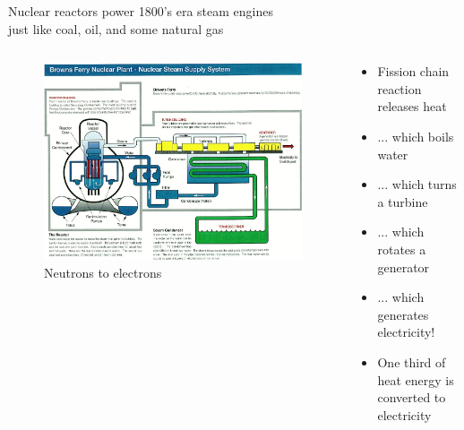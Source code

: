 \documentclass{beamer}
\begin{document}
        \begin{frame}{Nuclear reactors power 1800's era steam engines \\ just like coal, oil, and some natural gas}

            \begin{columns}[T]

                \begin{column}{0.5\textwidth}
                    \begin{figure}
                        \centering
                        \includegraphics[width=\textwidth]{./img/bwrBop.png}
                        \caption*{Neutrons to electrons}
                    \end{figure}
                \end{column}

                \begin{column}{0.5\textwidth}
                    \begin{itemize}
                        \item Fission chain reaction releases heat
                        \pause
                        \item ... which boils water
                        \pause
                        \item ... which turns a turbine
                        \pause
                        \item ... which rotates a generator
                        \pause
                        \item ... which generates electricity!
                        \pause

                        \vspace{2em}

                        \item One third of heat energy is converted to electricity

                    \end{itemize}
                \end{column}

            \end{columns}

        \end{frame}
\end{document}
